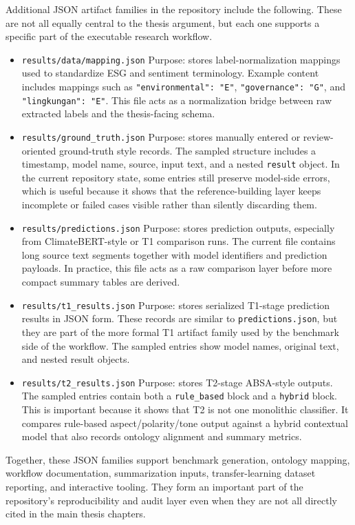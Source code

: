 \documentclass[english, online, cse, master]{dithesis}
\begin{document}
Additional JSON artifact families in the repository include the following. These are not all equally central to the thesis argument, but each one supports a specific part of the executable research workflow.

\begin{itemize}
\item
  \texttt{results/data/mapping.json} Purpose: stores label-normalization mappings used to standardize ESG and sentiment terminology. Example content includes mappings such as \texttt{"environmental":\ "E"}, \texttt{"governance":\ "G"}, and \texttt{"lingkungan":\ "E"}. This file acts as a normalization bridge between raw extracted labels and the thesis-facing schema.

\item
  \texttt{results/ground\_truth.json} Purpose: stores manually entered or review-oriented ground-truth style records. The sampled structure includes a timestamp, model name, source, input text, and a nested \texttt{result} object. In the current repository state, some entries still preserve model-side errors, which is useful because it shows that the reference-building layer keeps incomplete or failed cases visible rather than silently discarding them.
\item
  \texttt{results/predictions.json} Purpose: stores prediction outputs, especially from ClimateBERT-style or T1 comparison runs. The current file contains long source text segments together with model identifiers and prediction payloads. In practice, this file acts as a raw comparison layer before more compact summary tables are derived.

\item
  \texttt{results/t1\_results.json} Purpose: stores serialized T1-stage prediction results in JSON form. These records are similar to \texttt{predictions.json}, but they are part of the more formal T1 artifact family used by the benchmark side of the workflow. The sampled entries show model names, original text, and nested result objects.

\item
  \texttt{results/t2\_results.json} Purpose: stores T2-stage ABSA-style outputs. The sampled entries contain both a \texttt{rule\_based} block and a \texttt{hybrid} block. This is important because it shows that T2 is not one monolithic classifier. It compares rule-based aspect/polarity/tone output against a hybrid contextual model that also records ontology alignment and summary metrics.
\end{itemize}

Together, these JSON families support benchmark generation, ontology mapping, workflow documentation, summarization inputs, transfer-learning dataset reporting, and interactive tooling. They form an important part of the repository's reproducibility and audit layer even when they are not all directly cited in the main thesis chapters.
 
\end{document}

